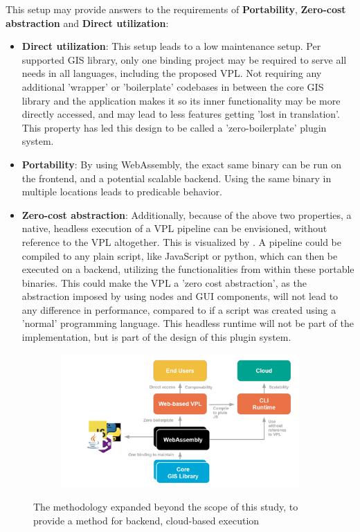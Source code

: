 This setup may provide answers to the requirements of \textbf{Portability}, \textbf{Zero-cost abstraction} and \textbf{Direct utilization}:
\begin{itemize}
  \item \textbf{Direct utilization}: This setup leads to a low maintenance setup. 
  Per supported \ac{GIS} library, only one binding project may be required to serve all needs in all languages, including the proposed VPL. 
  Not requiring any additional 'wrapper' or 'boilerplate' codebases in between the core GIS library and the application makes it so its inner functionality may be more directly accessed, and may lead to less features getting 'lost in translation'.
  This property has led this design to be called a 'zero-boilerplate' plugin system. 

  \item \textbf{Portability}: By using WebAssembly, the exact same binary can be run on the frontend, and a potential scalable backend. 
  Using the same binary in multiple locations leads to predicable behavior. 

  \item \textbf{Zero-cost abstraction}: Additionally, because of the above two properties, a native, headless execution of a VPL pipeline can be envisioned, without reference to the VPL altogether.
  This is visualized by .
  A pipeline could be compiled to any plain script, like JavaScript or python, which can then be executed on a backend, utilizing the functionalities from within these portable binaries. 
  This could make the VPL a 'zero cost abstraction', as the abstraction imposed by using nodes and \ac{GUI} components, will not lead to any difference in performance, compared to if a script was created using a 'normal' programming language.
  This headless runtime will not be part of the implementation, but is part of the design of this plugin system.
\end{itemize}

\begin{figure}
  \centering
  \begin{subfigure}[b]{0.80\linewidth}
    \centering
    \graphicspath{{../../assets/images/1/}}
    \includegraphics[width=\linewidth]{expanded-proposal.png}
  \end{subfigure}%
  \caption{The methodology expanded beyond the scope of this study, to provide a method for backend, cloud-based execution}
  \label{fig:proposal-extended}
\end{figure}

